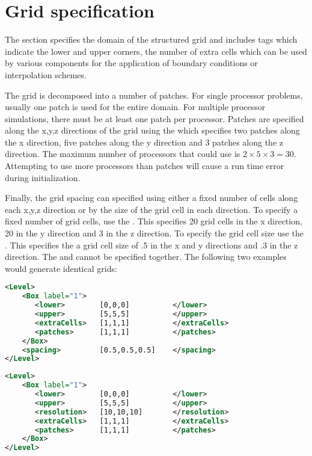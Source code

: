 \section{Grid specification} \label{Sec:Grid}
The  section specifies the domain of the
structured grid and includes tags which indicate the lower and upper
corners, the number of extra cells which can be used by various
components for the application of boundary conditions or interpolation
schemes.  

The grid is decomposed into a number of patches.  For single processor
problems, usually one patch is used for the entire domain.  For
multiple processor simulations, there must be at least one patch per
processor.  Patches are specified along the x,y,z directions of the
grid using the  which
specifies two patches along the x direction, five patches along the y
direction and 3 patches along the z direction.  The maximum number of
processors that  could use is $2\times 5\times 3 = 30$.
Attempting to use more processors than patches
will cause a run time error during initialization.

Finally, the grid spacing can specified using either a fixed number of
cells along each x,y,z direction or by the size of the grid cell in
each direction.  To specify a fixed number of grid cells, use the .  This specifies 20
grid cells in the x direction, 20 in the y direction and 3 in the z
direction.  To specify the grid cell size use the .  This specifies the a grid cell
size of .5 in the x and y directions and .3 in the z direction.  The
 and  cannot be
specified together.  The following two examples would generate
identical grids:
\begin{lstlisting}[language=XML]
<Level>
    <Box label="1">
       <lower>        [0,0,0]          </lower>
       <upper>        [5,5,5]          </upper>
       <extraCells>   [1,1,1]          </extraCells>
       <patches>      [1,1,1]          </patches>
    </Box>
    <spacing>         [0.5,0.5,0.5]    </spacing>
</Level>
\end{lstlisting}

\begin{lstlisting}[language=XML]
<Level>
    <Box label="1">
       <lower>        [0,0,0]          </lower>
       <upper>        [5,5,5]          </upper>
       <resolution>   [10,10,10]       </resolution>
       <extraCells>   [1,1,1]          </extraCells>
       <patches>      [1,1,1]          </patches>
    </Box>
</Level>
\end{lstlisting}

